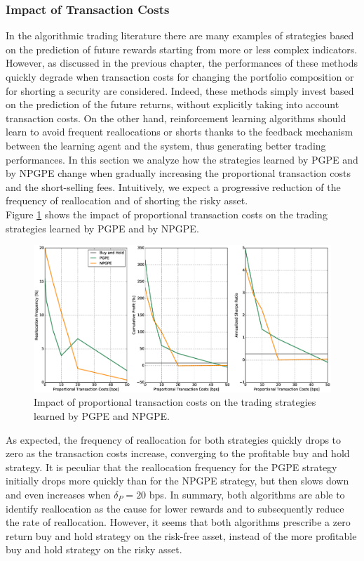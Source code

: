 \subsubsection{Impact of Transaction Costs}
In the algorithmic trading literature there are many examples of strategies based on the prediction of future rewards starting from more or less complex indicators. However, as discussed in the previous chapter, the performances of these methods quickly degrade when transaction costs for changing the portfolio composition or for shorting a security are considered. Indeed, these methods simply invest based on the prediction of the future returns, without explicitly taking into account transaction costs. On the other hand, reinforcement learning algorithms should learn to avoid frequent reallocations or shorts thanks to the feedback mechanism between the learning agent and the system, thus generating better trading performances. In this section we analyze how the strategies learned by PGPE and by NPGPE change when gradually increasing the proportional transaction costs and the short-selling fees. Intuitively, we expect a progressive reduction of the frequency of reallocation and of shorting the risky asset.\\
Figure \ref{fig:impact_transaction_costs} shows the impact of proportional transaction costs on the trading strategies learned by PGPE and by NPGPE. 
\begin{figure}[t!]
	\centering
	\includegraphics[width=1.0\textwidth]{Images/6_2_impact_transaction_costs}
	\caption[Impact of proportional transaction costs]{Impact of proportional transaction costs on the trading strategies learned by PGPE and NPGPE.}
	\label{fig:impact_transaction_costs}
\end{figure}
As expected, the frequency of reallocation for both strategies quickly drops to zero as the transaction costs increase, converging to the profitable buy and hold strategy. It is peculiar that the reallocation frequency for the PGPE strategy initially drops more quickly than for the NPGPE strategy, but then slows down and even increases when $\delta_P = 20$ bps. In summary, both algorithms are able to identify reallocation as the cause for lower rewards and to subsequently reduce the rate of reallocation. However, it seems that both algorithms prescribe a zero return buy and hold strategy on the risk-free asset, instead of the more profitable buy and hold strategy on the risky asset.\\
